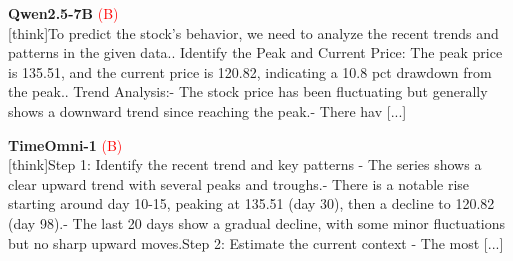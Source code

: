 \noindent
\begin{minipage}[t]{0.28\textwidth}
\colorbox{red!8}{\parbox{\dimexpr\textwidth-2\fboxsep}{
\textbf{Qwen2.5-7B} \textcolor{red}{(B)} \\[2pt]
\tiny
[think]\newline To predict the stock's behavior, we need to analyze the recent trends and patterns in the given data.. Identify the Peak and Current Price: The peak price is 135.51, and the current price is 120.82, indicating a 10.8 pct drawdown from the peak.. Trend Analysis:\newline    - The stock price has been fluctuating but generally shows a downward trend since reaching the peak.\newline    - There hav [...]
}}
\end{minipage}
\hfill
\begin{minipage}[t]{0.28\textwidth}
\colorbox{red!8}{\parbox{\dimexpr\textwidth-2\fboxsep}{
\textbf{TimeOmni-1} \textcolor{red}{(B)} \\[2pt]
\tiny
[think]\newline Step 1: Identify the recent trend and key patterns  \newline - The series shows a clear upward trend with several peaks and troughs.\newline - There is a notable rise starting around day 10-15, peaking at  135.51 (day 30), then a decline to  120.82 (day 98).\newline - The last 20 days show a gradual decline, with some minor fluctuations but no sharp upward moves.\newline Step 2: Estimate the current context  \newline - The most  [...]
}}
\end{minipage}
\hfill
